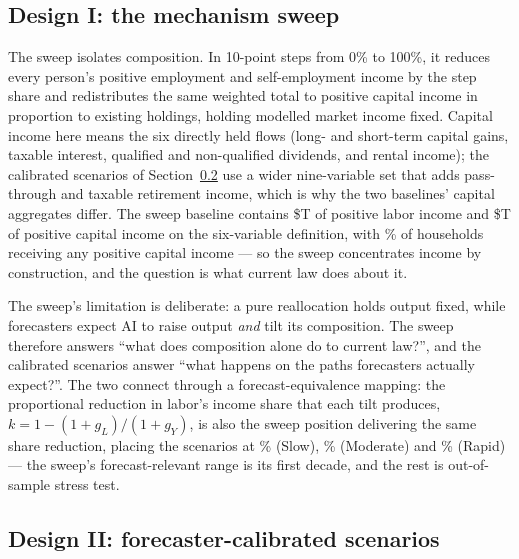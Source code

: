 \subsection{Design I: the mechanism sweep}\label{sec:method-sweep}

The sweep isolates composition. In 10-point steps from 0\% to 100\%, it
reduces every person's positive employment and self-employment income by the
step share and redistributes the same weighted total to positive capital
income in proportion to existing holdings, holding modelled market income
fixed. Capital income here means the six directly held flows (long- and
short-term capital gains, taxable interest, qualified and non-qualified
dividends, and rental income); the calibrated scenarios of
Section~\ref{sec:method-scenarios} use a wider nine-variable set that adds
pass-through and taxable retirement income, which is why the two baselines'
capital aggregates differ. The \genSweepYear{} sweep baseline contains
\$\genSweepLaborT T of positive labor income and \$\genSweepCapitalT T of
positive capital income on the six-variable definition, with
\genSweepHHCapSharePct\% of households receiving any positive capital income
--- so the sweep concentrates income by construction, and the question is
what current law does about it.

The sweep's limitation is deliberate: a pure reallocation holds output fixed,
while forecasters expect AI to raise output \emph{and} tilt its composition.
The sweep therefore answers ``what does composition alone do to current
law?'', and the calibrated scenarios answer ``what happens on the paths
forecasters actually expect?''. The two connect through a
forecast-equivalence mapping: the proportional reduction in labor's income
share that each tilt produces, $k = 1 - (1+g_L)/(1+g_Y)$, is also the sweep
position delivering the same share reduction, placing the scenarios at
\genForecastShiftSlowPct\% (Slow), \genForecastShiftModPct\% (Moderate) and
\genForecastShiftRapidPct\% (Rapid) --- the sweep's forecast-relevant range
is its first decade, and the rest is out-of-sample stress test.

\subsection{Design II: forecaster-calibrated scenarios}\label{sec:method-scenarios}

